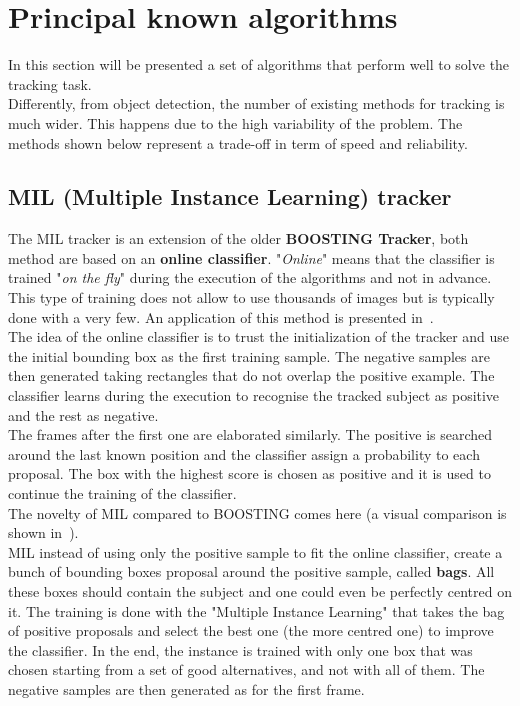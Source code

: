 \section{Principal known algorithms}
In this section will be presented a set of algorithms that perform well to solve the tracking task.\\
Differently, from object detection, the number of existing methods for tracking is much wider. This happens due to the high variability of the problem. The methods shown below represent a trade-off in term of speed and reliability.


\subsection{MIL (Multiple Instance Learning) tracker}
The MIL tracker\cite{mil}\cite{mil-robust} is an extension of the older \textbf{BOOSTING Tracker}\cite{boosting}, both method are based on an \textbf{online classifier}. "\textit{Online}" means that the classifier is trained "\textit{on the fly}" during the execution of the algorithms and not in advance. This type of training does not allow to use thousands of images but is typically done with a very few. An application of this method is presented in~.\\
The idea of the online classifier is to trust the initialization of the tracker and use the initial bounding box as the first training sample. The negative samples are then generated taking rectangles that do not overlap the positive example. The classifier learns during the execution to recognise the tracked subject as positive and the rest as negative.\\
The frames after the first one are elaborated similarly. The positive is searched around the last known position and the classifier assign a probability to each proposal. The box with the highest score is chosen as positive and it is used to continue the training of the classifier.\\
The novelty of MIL compared to BOOSTING comes here (a visual comparison is shown in~).\\
MIL instead of using only the positive sample to fit the online classifier, create a bunch of bounding boxes proposal around the positive sample, called \textbf{bags}. All these boxes should contain the subject and one could even be perfectly centred on it. The training is done with the "Multiple Instance Learning" that takes the bag of positive proposals and select the best one (the more centred one) to improve the classifier. In the end, the instance is trained with only one box that was chosen starting from a set of good alternatives, and not with all of them. The negative samples are then generated as for the first frame.

